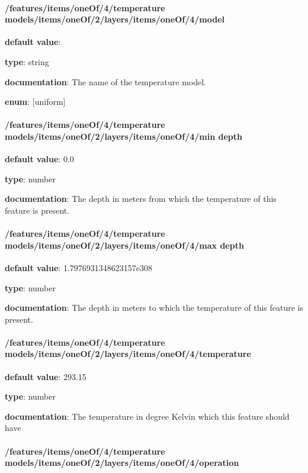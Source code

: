 \paragraph{/features/items/oneOf/4/temperature models/items/oneOf/2/layers/items/oneOf/4/model} \begin{itemized}
\item {\bf default value}: 
\item {\bf type}: string
\item {\bf documentation}: The name of the temperature model.
\item {\bf enum}: [uniform]\end{itemized}\paragraph{/features/items/oneOf/4/temperature models/items/oneOf/2/layers/items/oneOf/4/min depth} \begin{itemized}
\item {\bf default value}: 0.0
\item {\bf type}: number
\item {\bf documentation}: The depth in meters from which the temperature of this feature is present.
\end{itemized}\paragraph{/features/items/oneOf/4/temperature models/items/oneOf/2/layers/items/oneOf/4/max depth} \begin{itemized}
\item {\bf default value}: 1.7976931348623157e308
\item {\bf type}: number
\item {\bf documentation}: The depth in meters to which the temperature of this feature is present.
\end{itemized}\paragraph{/features/items/oneOf/4/temperature models/items/oneOf/2/layers/items/oneOf/4/temperature} \begin{itemized}
\item {\bf default value}: 293.15
\item {\bf type}: number
\item {\bf documentation}: The temperature in degree Kelvin which this feature should have
\end{itemized}\paragraph{/features/items/oneOf/4/temperature models/items/oneOf/2/layers/items/oneOf/4/operation} \begin{itemized}

\end{itemized}
